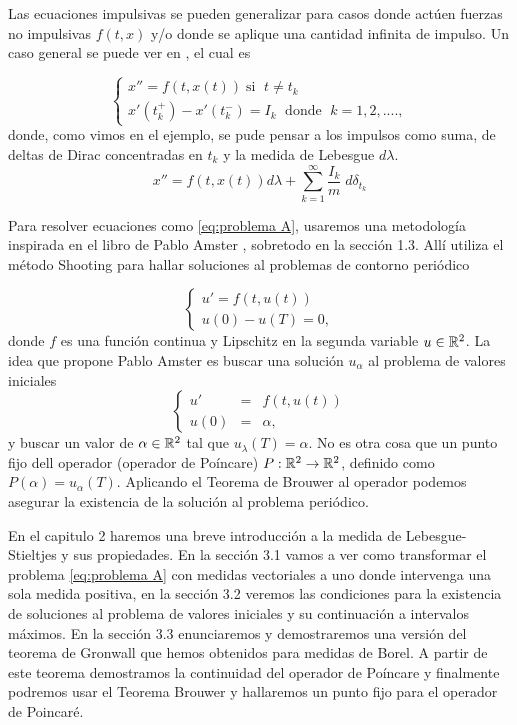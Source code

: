 Las ecuaciones impulsivas se pueden generalizar para casos donde actúen fuerzas no impulsivas $f(t,x)$ y/o donde se aplique una cantidad infinita de impulso. Un caso general se puede ver en \cite{Bainov}, el cual es

	\begin{equation*}
		\left\lbrace \begin{array}{l}
			x''=f(t,x(t)) \; \text{si }\; t\neq t_k\\
			 x'(t_k^+)-x'(t_k^-)=I_k \; \text{ donde }\; k=1,2,....,
		\end{array}\right. 
	\end{equation*}
donde, como vimos en el ejemplo, se pude pensar a los impulsos como suma, de deltas de Dirac concentradas en $t_k$ y la medida de Lebesgue $d\lambda$.
$$x''=f(t,x(t)) d\lambda +\sum_{k=1}^{\infty}\dfrac{I_k}{m}\;d\delta_{t_k}$$

Para resolver ecuaciones como \ref{eq:problema A}, usaremos una metodología inspirada en el libro de Pablo Amster \cite{Amster}, sobretodo en la sección 1.3. Allí utiliza el método Shooting para hallar soluciones al problemas de contorno periódico 

	\begin{equation*}
		\left\lbrace \begin{array}{l}
			u'=f(t,u(t))\\
			u(0)-u(T)=0,
		\end{array}\right. 
	\end{equation*}
donde $f$ es una función continua y Lipschitz en la segunda variable $u\in\mathbb{R}^2$.  La idea que propone Pablo Amster es buscar una solución $u_\alpha$ al problema de valores iniciales 
	\begin{equation*}
	\left\lbrace \begin{array}{lcl}
		u'&=&f(t,u(t))\\
		u(0)&=&\alpha,
	\end{array}\right. 
\end{equation*}
y buscar un valor de $\alpha\in\mathbb{R}^2$ tal que $u_\lambda(T)=\alpha$. No es otra cosa que un punto fijo dell operador (operador de Poíncare) $P:\mathbb{R}^2\to \mathbb{R}^2$, definido como $P(\alpha)=u_\alpha(T)$. Aplicando el Teorema de Brouwer \cite{Amster} al operador podemos asegurar la existencia de la solución al problema periódico. 

En el capitulo 2 haremos una breve introducción a la medida de Lebesgue-Stieltjes y sus propiedades.  En la sección 3.1 vamos a ver como transformar el problema \eqref{eq:problema A} con medidas vectoriales a uno donde intervenga una sola medida positiva, en la sección 3.2 veremos las condiciones para la existencia de soluciones al problema de valores iniciales y su continuación a intervalos máximos. En la sección 3.3 enunciaremos y demostraremos una versión del teorema de Gronwall que hemos obtenidos para medidas de Borel. A partir de este teorema demostramos la continuidad del operador de Poíncare y finalmente podremos usar el Teorema Brouwer y  hallaremos un punto fijo para el operador de Poincaré.  